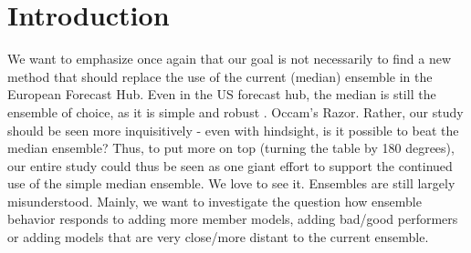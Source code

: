 

\usepackage{array,multirow,graphicx}








\tableofcontents

\clearpage

\listoffigures
\clearpage


\printacronyms
\clearpage




\vspace{2cm}
\section{Introduction}

We want to emphasize once again that our goal is not necessarily to find a new method that should replace the use of the current (median) ensemble in the European Forecast Hub. Even in the US forecast hub, the median is still the ensemble of choice, as it is simple and robust \citep{ray_ensemble_2020}. Occam's Razor. Rather, our study should be seen more inquisitively - even with hindsight, is it possible to beat the median ensemble? Thus, to put more on top (turning the table by 180 degrees), our entire study could thus be seen as one giant effort to support the continued use of the simple median ensemble. We love to see it. Ensembles are still largely misunderstood. Mainly, we want to investigate the question how ensemble behavior responds to adding more member models, adding bad/good performers or adding models that are very close/more distant to the current ensemble.
